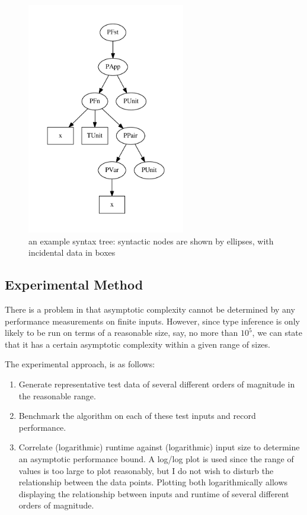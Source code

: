 \begin{figure}
\centering
\includegraphics[height=4in]{chapters/evaluation/figures/example-tree.pdf}
\caption{an example syntax tree: syntactic nodes are shown by ellipses, with incidental data in boxes}
\label{fig:example-tree}
\end{figure}

\subsection{Experimental Method}
There is a problem in that asymptotic complexity cannot be determined by any performance measurements on finite inputs.
However, since type inference is only likely to be run on terms of a reasonable size, say, no more than \(10^5\), we can state that it has a certain asymptotic complexity within a given range of sizes.

The experimental approach, is as follows:
\begin{enumerate}
\item
Generate representative test data of several different orders of magnitude in the reasonable range.
\item
Benchmark the algorithm on each of these test inputs and record performance.
\item
Correlate (logarithmic) runtime against (logarithmic) input size to determine an asymptotic performance bound.
A log/log plot is used since the range of values is too large to plot reasonably, but I do not wish to disturb the relationship between the data points.
Plotting both logarithmically allows displaying the relationship between inputs and runtime of several different orders of magnitude.
\end{enumerate}

